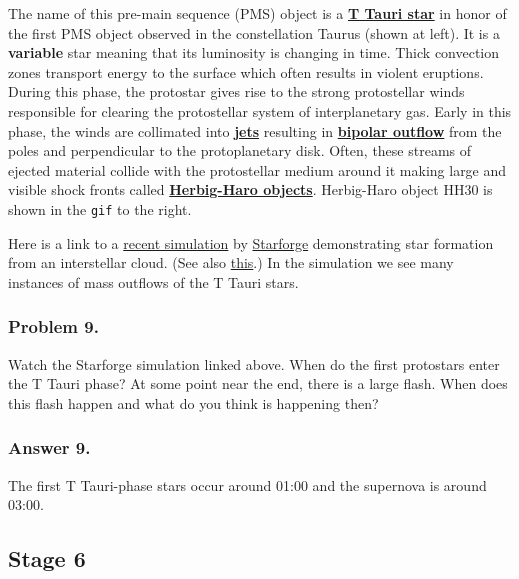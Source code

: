 \documentclass[11pt]{article}
\begin{document}
The name of this pre-main sequence (PMS) object is a
\href{https://en.wikipedia.org/wiki/T_Tauri_star}{\textbf{T Tauri star}}
in honor of the first PMS object observed in the constellation Taurus
(shown at left). It is a \textbf{variable} star meaning that its
luminosity is changing in time. Thick convection zones transport energy
to the surface which often results in violent eruptions. During this
phase, the protostar gives rise to the strong protostellar winds
responsible for clearing the protostellar system of interplanetary gas.
Early in this phase, the winds are collimated into
\href{https://en.wikipedia.org/wiki/Astrophysical_jet}{\textbf{jets}}
resulting in
\href{https://en.wikipedia.org/wiki/Bipolar_outflow}{\textbf{bipolar
outflow}} from the poles and perpendicular to the protoplanetary disk.
Often, these streams of ejected material collide with the protostellar
medium around it making large and visible shock fronts called
\href{https://en.wikipedia.org/wiki/Herbig–Haro_object}{\textbf{Herbig-Haro
objects}}. Herbig-Haro object HH30 is shown in the \texttt{gif} to the
right.

Here is a link to a
\href{https://www.youtube.com/watch?v=8nCW7419FyU&t=63s}{recent
simulation} by \href{https://starforge.space/index.html}{Starforge}
demonstrating star formation from an interstellar cloud. (See also
\href{https://www.youtube.com/watch?v=PUyE3j0aoMw}{this}.) In the
simulation we see many instances of mass outflows of the T Tauri stars.

 
\subsubsection{Problem 9.}\label{problem-9.}

Watch the Starforge simulation linked above. When do the first
protostars enter the T Tauri phase? At some point near the end, there is
a large flash. When does this flash happen and what do you think is
happening then?
 

     
\subsubsection{Answer 9.}\label{answer-9.}

The first T Tauri-phase stars occur around 01:00 and the supernova is
around 03:00.
 

    \subsection{Stage 6}\label{stage-6}
\end{document}
